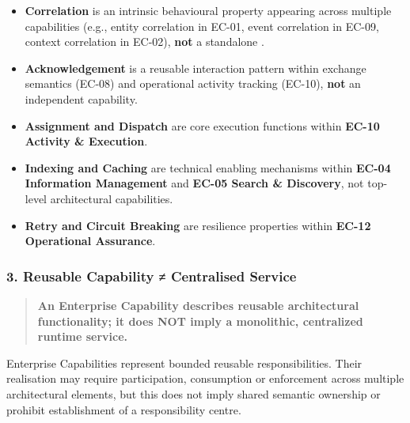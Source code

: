 \begin{itemize}

\item 
\textbf{Correlation} is an intrinsic behavioural property appearing across multiple capabilities (e.g., entity correlation in EC-01, event correlation in EC-09, context correlation in EC-02), \textbf{not} a standalone \texttt{}.



\item 
\textbf{Acknowledgement} is a reusable interaction pattern within exchange semantics (EC-08) and operational activity tracking (EC-10), \textbf{not} an independent capability.



\item 
\textbf{Assignment and Dispatch} are core execution functions within \textbf{EC-10 Activity \& Execution}.



\item 
\textbf{Indexing and Caching} are technical enabling mechanisms within \textbf{EC-04 Information Management} and \textbf{EC-05 Search \& Discovery}, not top-level architectural capabilities.



\item 
\textbf{Retry and Circuit Breaking} are resilience properties within \textbf{EC-12 Operational Assurance}.



\end{itemize}
\label{rad:enterprise:53}
\subsubsection*{3. Reusable Capability ≠ Centralised Service}
\label{rad:enterprise:54}

\begin{quote}

\textbf{An Enterprise Capability describes reusable architectural functionality; it does NOT imply a monolithic, centralized runtime service.}


\end{quote}
\label{rad:enterprise:56}

Enterprise Capabilities represent bounded reusable responsibilities. Their realisation may require participation, consumption or enforcement across multiple architectural elements, but this does not imply shared semantic ownership or prohibit establishment of a responsibility centre.

